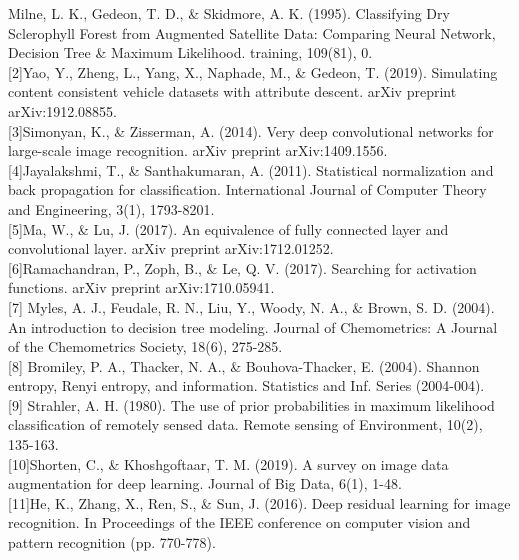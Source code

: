 \documentclass[runningheads]{llncs}
\begin{document}
\quad 
[1]Milne, L. K., Gedeon, T. D., \& Skidmore, A. K. (1995). Classifying Dry Sclerophyll Forest from Augmented Satellite Data: Comparing Neural Network, Decision Tree \& Maximum Likelihood. training, 109(81), 0.\\

[2]Yao, Y., Zheng, L., Yang, X., Naphade, M., \& Gedeon, T. (2019). Simulating content consistent vehicle datasets with attribute descent. arXiv preprint arXiv:1912.08855.\\

[3]Simonyan, K., \& Zisserman, A. (2014). Very deep convolutional networks for large-scale image recognition. arXiv preprint arXiv:1409.1556.\\

[4]Jayalakshmi, T., \& Santhakumaran, A. (2011). Statistical normalization and back propagation for classification. International Journal of Computer Theory and Engineering, 3(1), 1793-8201.\\

[5]Ma, W., \& Lu, J. (2017). An equivalence of fully connected layer and convolutional layer. arXiv preprint arXiv:1712.01252.\\

[6]Ramachandran, P., Zoph, B., \& Le, Q. V. (2017). Searching for activation functions. arXiv preprint arXiv:1710.05941.\\

[7] Myles, A. J., Feudale, R. N., Liu, Y., Woody, N. A., \& Brown, S. D. (2004). An introduction to decision tree modeling. Journal of Chemometrics: A Journal of the Chemometrics Society, 18(6), 275-285.\\

[8] Bromiley, P. A., Thacker, N. A., \& Bouhova-Thacker, E. (2004). Shannon entropy, Renyi entropy, and information. Statistics and Inf. Series (2004-004).\\

[9] Strahler, A. H. (1980). The use of prior probabilities in maximum likelihood classification of remotely sensed data. Remote sensing of Environment, 10(2), 135-163.\\

[10]Shorten, C., \& Khoshgoftaar, T. M. (2019). A survey on image data augmentation for deep learning. Journal of Big Data, 6(1), 1-48.\\

[11]He, K., Zhang, X., Ren, S., \& Sun, J. (2016). Deep residual learning for image recognition. In Proceedings of the IEEE conference on computer vision and pattern recognition (pp. 770-778).\\
\end{document}
